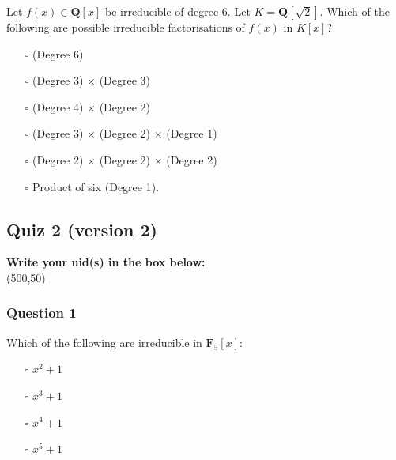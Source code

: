 \documentclass[11pt]{article}
\begin{document}
Let \(f(x) \in \mathbf{Q}[x]\) be irreducible of degree 6.
Let \(K = \mathbf{Q}[\sqrt 2]\).
Which of the following are possible irreducible factorisations of \(f(x)\) in \(K[x]\)?\\

\begin{itemize}
\item[{$\square$}] (Degree 6)\\
\item[{$\square$}] (Degree 3) \(\times\) (Degree 3)\\
\item[{$\square$}] (Degree 4) \(\times\) (Degree 2)\\
\item[{$\square$}] (Degree 3) \(\times\) (Degree 2) \(\times\) (Degree 1)\\
\item[{$\square$}] (Degree 2) \(\times\) (Degree 2) \(\times\) (Degree 2)\\
\item[{$\square$}] Product of six (Degree 1).
\end{itemize}
\subsection{Quiz 2 (version 2)}
\label{sec:org879b6eb}
\vspace{1cm}

\noindent
\textbf{Write your uid(s) in the box below:}\\
\framebox(500,50)

\vspace{1cm}
\subsubsection{Question 1}
\label{sec:org5a588b1}

Which of the following are irreducible in \(\mathbf{F}_5[x]\):\\

\begin{itemize}
\item[{$\square$}] \(x^2+1\)\\
\item[{$\square$}] \(x^3+1\)\\
\item[{$\square$}] \(x^4+1\)\\
\item[{$\square$}] \(x^5+1\)\\
\end{itemize}
\end{document}
